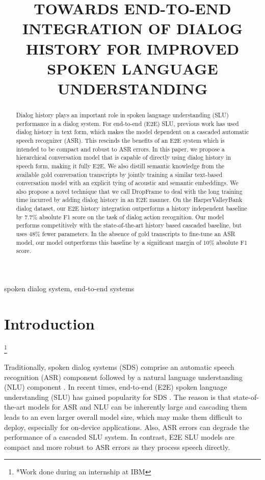\documentclass{article}
\title{TOWARDS END-TO-END INTEGRATION OF DIALOG HISTORY FOR IMPROVED SPOKEN LANGUAGE UNDERSTANDING}
\newcommand\blfootnote[1]{%
  \begingroup
  \renewcommand\thefootnote{}\footnote{#1}%
  \addtocounter{footnote}{-1}%
  \endgroup
}
\begin{document}
%
\maketitle
%
\begin{abstract}
Dialog history plays an important role in spoken language understanding (SLU) performance in a dialog system. For end-to-end (E2E) SLU, previous work has used dialog history in text form, which makes the model dependent on a cascaded automatic speech recognizer (ASR). This rescinds the benefits of an E2E system which is intended to be compact and robust to ASR errors. In this paper, we propose a hierarchical conversation model that is capable of directly using dialog history in speech form, making it fully E2E. We also distill semantic knowledge from the available gold conversation transcripts by jointly training a similar text-based conversation model with an explicit tying of acoustic and semantic embeddings. We also propose a novel technique that we call DropFrame to deal with the long training time incurred by adding dialog history in an E2E manner. On the HarperValleyBank dialog dataset, our E2E history integration outperforms a history independent baseline by 7.7\% absolute F1 score on the task of dialog action recognition. Our model performs competitively with the state-of-the-art history based cascaded baseline, but uses 48\% fewer parameters. In the absence of gold transcripts to fine-tune an ASR model, our model outperforms this baseline by a significant margin of 10\% absolute F1 score.
\end{abstract}
%
\begin{keywords}
spoken dialog system, end-to-end systems
\end{keywords}
%
\section{Introduction}
\label{sec:intro}
\blfootnote{*Work done during an internship at IBM}

Traditionally, spoken dialog systems (SDS) comprise an automatic speech recognition (ASR) component followed by a natural language understanding (NLU) component \cite{tur2002improving, hakkani2006beyond, henderson2012discriminative, huang2019adapting}. In recent times, end-to-end (E2E) spoken language understanding (SLU) has gained popularity for SDS \cite{rongali2020exploring, chung2021splat, morais2021end, denisov2020pretrained}. The reason is that state-of-the-art models for ASR and NLU can be inherently large and cascading them leads to an even larger overall model size, which may make them difficult to deploy, especially for on-device applications. Also, ASR errors can degrade the performance of a cascaded SLU system. In contrast, E2E SLU models are compact and more robust to ASR errors as they process speech directly.
\end{document}
